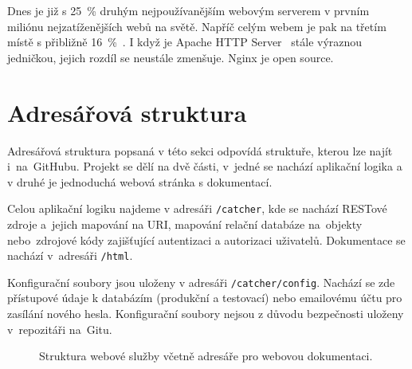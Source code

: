 Dnes je již s 25~\% druhým nejpoužívanějším webovým serverem v prvním miliónu nejzatíženějších webů na světě.
Napříč celým webem je pak na třetím místě s přibližně 16~\%~\cite{nginx_statistic}.
I když je Apache HTTP Server~\cite{apache} stále výraznou jedničkou, jejich rozdíl se neustále zmenšuje. Nginx je open source.


\section{Adresářová struktura}

Adresářová struktura popsaná v této sekci odpovídá struktuře, kterou lze najít i~na~GitHubu.
Projekt se dělí na dvě části, v~jedné se nachází aplikační logika a v druhé je jednoduchá webová stránka s dokumentací.

Celou aplikační logiku najdeme v adresáři \texttt{/catcher}, kde se nachází RESTové zdroje a~jejich mapování na URI,
mapování relační databáze na~objekty nebo~zdrojové kódy zajišťující autentizaci a autorizaci uživatelů.
Dokumentace se nachází v~adresáři \texttt{/html}.

Konfigurační soubory jsou uloženy v adresáři \texttt{/catcher/config}.
Nachází se zde přístupové údaje k databázím (produkční a testovací) nebo emailovému účtu pro zasílání nového hesla.
Konfigurační soubory nejsou z důvodu bezpečnosti uloženy v~repozitáři na~Gitu. 

\begin{figure}[ht!]
\caption{Struktura webové služby včetně adresáře pro webovou dokumentaci.\label{overflow}}
\end{figure}

